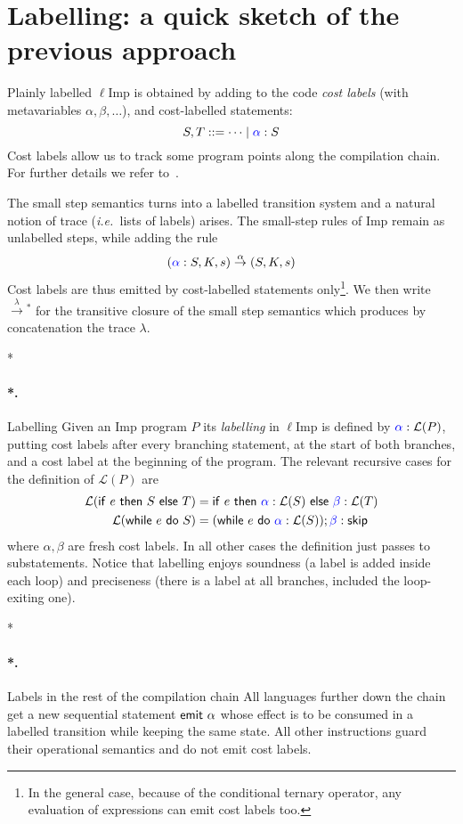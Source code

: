 \documentclass[submission,copyright,creativecommons]{eptcs}
\makeatletter
\theoremstyle{definition}
\newcommand{\s}[1]{{\sf #1}}    \newcommand{\vc}[1]{{\bf #1}}
\newcommand{\imp}{{\sf Imp}}            \newcommand{\vm}{{\sf Vm}}              \newcommand{\mips}{{\sf Mips}}          \newcommand{\Clight}{{\sf Clight}}        \newcommand{\Cminor}{{\sf Cminor}}
\newcommand{\sop}[1]{\s{#1}\ }
\newcommand{\sbin}[1]{\ \s{#1}\ }
\newcommand{\Ell}{\mathcal L}
\newcommand{\gramm}{\mathrel{::=}}
\renewcommand{\to}[1][]{\stackrel{#1}{\rightarrow}}
\newcommand{\ie}{\emph{i.e.\ }}
\def\lbl#1:{\mbox{\color{blue}$#1$}:}
\let\oldparagraph\paragraph
\def\paragraph{\@ifnextchar*\new@paragraph@star\new@paragraph}
\def\new@paragraph@star*#1{\oldparagraph*{#1.}}
\def\new@paragraph#1{\oldparagraph{#1.}}
\makeatother
\begin{document}
\section{Labelling: a quick sketch of the previous approach}
\label{sec:labelling}
Plainly labelled $\ell$\imp{} is obtained by adding to the code \emph{cost labels}
(with metavariables $\alpha,\beta,\ldots$), and cost-labelled statements:
$$
S,T\gramm \cdots \mid \lbl\alpha: S
$$
Cost labels allow us to track some program points along the compilation chain.
For further details we refer to~\cite{labeling}.

The small step semantics turns into a labelled transition system
and a natural notion of trace (\ie lists of labels) arises. The small-step rules
of \imp{} remain as unlabelled steps, while adding the rule
$$(\lbl\alpha: S,K,s) \to[\alpha] (S,K,s)$$
Cost labels are thus emitted by cost-labelled statements only\footnote{In the general case,
because of the conditional ternary operator, any evaluation of expressions can emit cost labels too.}.
We then write $\to[\lambda]\!\!^*$ for the transitive closure of the small step semantics which produces by concatenation the trace $\lambda$.

\paragraph*{Labelling}
Given an \imp{} program $P$ its \emph{labelling}
in $\ell$\imp{} is defined by $\lbl\alpha:\Ell(P)$,
putting cost labels after every branching statement, at the start of both branches, and a cost label at the beginning of the program.
The relevant recursive cases for the definition of $\Ell(P)$ are
$$\begin{aligned}
  \Ell(\sop{if}e\sbin{then}S\sbin{else}T) &=
    \sop{if}e\sbin{then}\lbl\alpha:\Ell(S)\sbin{else}\lbl\beta:\Ell(T)\\
  \Ell(\sop{while}e\sbin{do}S) &=
    (\sop{while}e\sbin{do}\lbl\alpha:\Ell(S));\lbl\beta:\s{skip}\\
\end{aligned}$$
where $\alpha,\beta$ are fresh cost labels.
In all other cases the definition just passes to substatements. Notice that
labelling enjoys soundness (a label is added inside each loop) and preciseness
(there is a label at all branches, included the loop-exiting one).

\paragraph*{Labels in the rest of the compilation chain}
All languages further down the chain get a new sequential statement $\sop{emit}\alpha$ whose effect is to be consumed in a labelled transition while keeping the same state.
All other instructions guard their operational semantics and do not emit cost labels.
\end{document}
